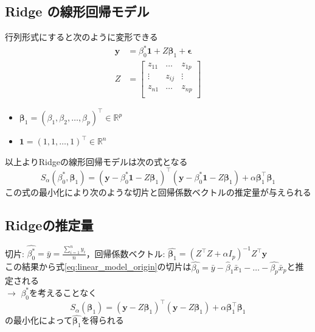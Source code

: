 \documentclass[dvipdfmx, 10pt]{beamer}
\begin{document}
\subsection{Ridge の線形回帰モデル}
\begin{frame}{\insertsubsection}
    行列形式にすると次のように変形できる
    \begin{equation}
	\begin{split}
		\bm{y} &= \beta_0^* \bm{1} + Z \bm{\beta}_1 + \bm{\epsilon}\\
		Z &= \left[
                \begin{array}{ccc}
                z_{11} & \dots & z_{1p} \\
                \vdots & z_{ij} & \vdots \\
                z_{n1} & \dots & z_{np} \\
                \end{array}
                \right]
        \end{split}
	\label{eq:linear_model_mat}
    \end{equation}
    \begin{itemize}
    	\item $\bm{\beta}_1 = (\beta_1, \beta_2, \dots , \beta_p)^{\top} \in \mathbb{R}^p$
	\item $ \bm{1} = (1, 1, \dots , 1)^{\top} \in \mathbb{R}^n$
    \end{itemize}
    \vspace{10pt}
    以上よりRidgeの線形回帰モデルは次の式となる
    \begin{equation}
        	S_{\alpha}(\beta_0^* , \bm{\beta}_1) = (\bm{y} - \beta_0^* \bm{1} - Z \bm{\beta}_1)^{\top} (\bm{y} - \beta_0^* \bm{1} - Z \bm{\beta}_1) + \alpha \bm{\beta}_1^{\top} \bm{\beta}_1 
    	\label{eq:ridge_estimate}
    \end{equation}
    \vspace{10pt}
    この式の最小化により次のような切片と回帰係数ベクトルの推定量が与えられる
\end{frame}
\subsection{Ridgeの推定量}
\begin{frame}{\insertsubsection}
        切片: $\hat{\beta_0^*} = \bar{y} = \frac{\sum_{i=1}^{n}{y_i}}{n}$，回帰係数ベクトル: $\hat{\bm{\beta}_1} = (Z^{\top}Z + \alpha I_p)^{-1} Z^{\top} \bm{y}$\\
    \vspace{10pt}
    この結果から式\eqref{eq:linear_model_origin}の切片は$\hat{\beta_0} = \bar{y} - \hat{\beta}_1 \bar{x}_1 - \dots - \hat{\beta_p} \bar{x}_p$と推定される\\
    \vspace{10pt}
    $\rightarrow$ \quad $\beta_0^*$を考えることなく
\begin{equation}
	S_{\alpha}(\bm{\beta}_1) = (\bm{y} - Z \bm{\beta}_1)^{\top}  (\bm{y} - Z\bm{\beta}_1) + \alpha \bm{\beta}_1^{\top} \bm{\beta}_1
	\label{eq:ridge_estimate_beta1hat}
\end{equation}
の最小化によって$\hat{\bm{\beta}_1}$を得られる
\end{frame}
\end{document}
